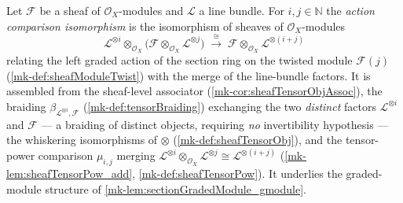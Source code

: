 \begin{definition}\label{mk-def:moduleTensorPowAdd}
  \leanok

  Let \(\mathcal{F}\) be a sheaf of \(\mathcal{O}_X\)-modules and \(\mathcal{L}\) a
  line bundle. For \(i, j \in \mathbb{N}\) the \emph{action comparison
  isomorphism} is the isomorphism of sheaves of \(\mathcal{O}_X\)-modules
  \[
    \mathcal{L}^{\otimes i} \otimes_{\mathcal{O}_X}
      \bigl(\mathcal{F} \otimes_{\mathcal{O}_X} \mathcal{L}^{\otimes j}\bigr)
    \;\xrightarrow{\ \cong\ }\;
    \mathcal{F} \otimes_{\mathcal{O}_X} \mathcal{L}^{\otimes (i+j)}
  \]
  relating the left graded action of the section ring on the twisted module
  \(\mathcal{F}(j)\) (\ref{mk-def:sheafModuleTwist}) with the merge of the
  line-bundle factors. It is assembled from the sheaf-level associator
  (\ref{mk-cor:sheafTensorObjAssoc}), the braiding
  \(\beta_{\mathcal{L}^{\otimes i},\mathcal{F}}\) (\ref{mk-def:tensorBraiding})
  exchanging the two \emph{distinct} factors \(\mathcal{L}^{\otimes i}\) and
  \(\mathcal{F}\) --- a braiding of distinct objects, requiring \emph{no}
  invertibility hypothesis --- the whiskering isomorphisms of \(\otimes\)
  (\ref{mk-def:sheafTensorObj}), and the tensor-power comparison \(\mu_{i,j}\)
  merging \(\mathcal{L}^{\otimes i} \otimes_{\mathcal{O}_X} \mathcal{L}^{\otimes j}
  \cong \mathcal{L}^{\otimes (i+j)}\) (\ref{mk-lem:sheafTensorPow_add},
  \ref{mk-def:sheafTensorPow}). It underlies the graded-module
  structure of \ref{mk-lem:sectionGradedModule_gmodule}.
\end{definition}

